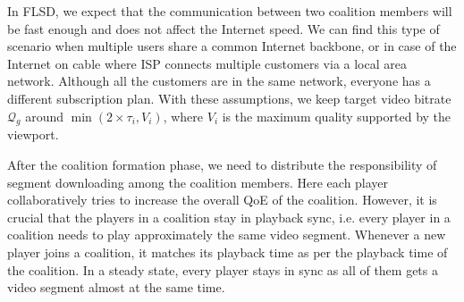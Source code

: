 In FLSD, we expect that the communication between two coalition members will be fast enough and does not affect the Internet speed. We can find this type of scenario when multiple users share a common Internet backbone, or in case of the Internet on cable where ISP connects multiple customers via a local area network. Although all the customers are in the same network, everyone has a different subscription plan. With these assumptions, we keep target video bitrate $\mathcal{Q}_g$ around $\min(2\times\tau_i, V_i)$, where $V_i$ is the maximum quality supported by the viewport. 

After the coalition formation phase, we need to distribute the responsibility of segment downloading among the coalition members. Here each player collaboratively tries to increase the overall QoE of the coalition. However, it is crucial that the players in a coalition stay in playback sync, i.e. every player in a coalition needs to play approximately the same video segment. Whenever a new player joins a coalition, it matches its playback time as per the playback time of the coalition. In a steady state, every player stays in sync as all of them gets a video segment almost at the same time.

